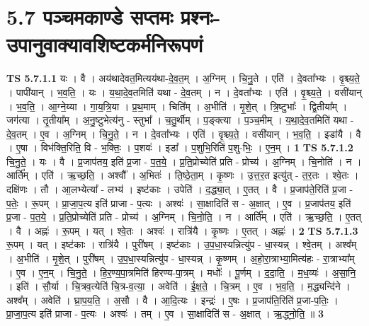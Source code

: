 \documentclass[17pt]{extarticle}
\begin{document}
\section*{ 5.7      पञ्चमकाण्डे सप्तमः प्रश्नः-उपानुवाक्यावशिष्टकर्मनिरूपणं }
                                \textbf{ TS 5.7.1.1} \newline
                  यः । वै । अय॑थादेवत॒मित्यय॑था-दे॒व॒त॒म् । अ॒ग्निम् । चि॒नु॒ते । एति॑ । दे॒वता᳚भ्यः । वृ॒श्च्य॒ते॒ । पापी॑यान् । भ॒व॒ति॒ । यः । य॒था॒दे॒व॒तमिति॑ यथा - दे॒व॒तम् । न । दे॒वता᳚भ्यः । एति॑ । वृ॒श्च्य॒ते॒ । वसी॑यान् । भ॒व॒ति॒ । आ॒ग्ने॒य्या । गा॒य॒त्रि॒या । प्र॒थ॒माम् । चिति᳚म् । अ॒भीति॑ । मृ॒शे॒त् । त्रि॒ष्टुभाः᳚ । द्वि॒तीया᳚म् । जग॑त्या । तृ॒तीया᳚म् । अ॒नु॒ष्टुभेत्य॑नु - स्तुभा᳚ । च॒तु॒र्थीम् । प॒ङ्क्त्या । प॒ञ्च॒मीम् । य॒था॒दे॒व॒तमिति॑ यथा - दे॒व॒तम् । ए॒व । अ॒ग्निम् । चि॒नु॒ते॒ । न । दे॒वता᳚भ्यः । एति॑ । वृ॒श्च्य॒ते॒ । वसी॑यान् । भ॒व॒ति॒ । इडा॑यै । वै । ए॒षा । विभ॑क्ति॒रिति॒ वि - भ॒क्तिः॒ । प॒शवः॑ । इडा᳚ । प॒शुभि॒रिति॑ प॒शु-भिः॒ । ए॒न॒म् । \textbf{  1} \newline
                  \newline
                                \textbf{ TS 5.7.1.2} \newline
                  चि॒नु॒ते॒ । यः । वै । प्र॒जाप॑तय॒ इति॑ प्र॒जा -  प॒त॒ये॒ । प्र॒ति॒प्रोच्येति॑ प्रति - प्रोच्य॑ । अ॒ग्निम् । चि॒नोति॑ । न । आर्ति᳚म् । एति॑ । ऋ॒च्छ॒ति॒ । अश्वौ᳚ । अ॒भितः॑ । ति॒ष्ठे॒ता॒म् । कृ॒ष्णः । उ॒त्त॒र॒त इत्यु॑त् -   त॒र॒तः । श्वे॒तः । दक्षि॑णः । तौ । आ॒लभ्येत्या᳚ - लभ्य॑ । इष्ट॑काः । उपेति॑ । द॒द्ध्या॒त् । ए॒तत् । वै । प्र॒जाप॑ते॒रिति॑ प्र॒जा - प॒तेः॒ । रू॒पम् । प्रा॒जा॒प॒त्य इति॑ प्राजा - प॒त्यः । अश्वः॑ । सा॒क्षादिति॑ स - अ॒क्षात् । ए॒व । प्र॒जाप॑तय॒ इति॑ प्र॒जा - प॒त॒ये॒ । प्र॒ति॒प्रोच्येति॑ प्रति - प्रोच्य॑ । अ॒ग्निम् । चि॒नो॒ति॒ । न । आर्ति᳚म् । एति॑ । ऋ॒च्छ॒ति॒ । ए॒तत् । वै । अह्नः॑ । रू॒पम् । यत् । श्वे॒तः । अश्वः॑ । रात्रि॑यै । कृ॒ष्णः । ए॒तत् । अह्नः॑ । \textbf{  2} \newline
                  \newline
                                \textbf{ TS 5.7.1.3} \newline
                  रू॒पम् । यत् । इष्ट॑काः । रात्रि॑यै । पुरी॑षम् । इष्ट॑काः । उ॒प॒धा॒स्यन्नित्यु॑प - धा॒स्यन्न् । श्वे॒तम् । अश्व᳚म् । अ॒भीति॑ । मृ॒शे॒त् । पुरी॑षम् । उ॒प॒धा॒स्यन्नित्यु॑प - धा॒स्यन्न् । कृ॒ष्णम् । अ॒हो॒रा॒त्राभ्या॒मित्य॑हः - रा॒त्राभ्या᳚म् । ए॒व । ए॒न॒म् । चि॒नु॒ते॒ । हि॒र॒ण्य॒पा॒त्रमिति॑ हिरण्य-पा॒त्रम् । मधोः᳚ । पू॒र्णम् । द॒दा॒ति॒ । म॒ध॒व्यः॑ । अ॒सा॒नि॒ । इति॑ । सौ॒र्या । चि॒त्रव॒त्येति॑ चि॒त्र-व॒त्या॒ । अवेति॑ । ई॒क्ष॒ते॒ । चि॒त्रम् । ए॒व । भ॒व॒ति॒ । म॒द्ध्यन्दि॑ने । अश्व᳚म् । अवेति॑ । घ्रा॒प॒य॒ति॒ । अ॒सौ । वै । आ॒दि॒त्यः । इन्द्रः॑ । ए॒षः । प्र॒जाप॑ति॒रिति॑ प्र॒जा-प॒तिः॒ । प्रा॒जा॒प॒त्य इति॑ प्राजा - प॒त्यः । अश्वः॑ । तम् । ए॒व । सा॒क्षादिति॑ स - अ॒क्षात् । ऋ॒द्ध्नो॒ति॒ ॥ \textbf{  3} \newline
\end{document}
